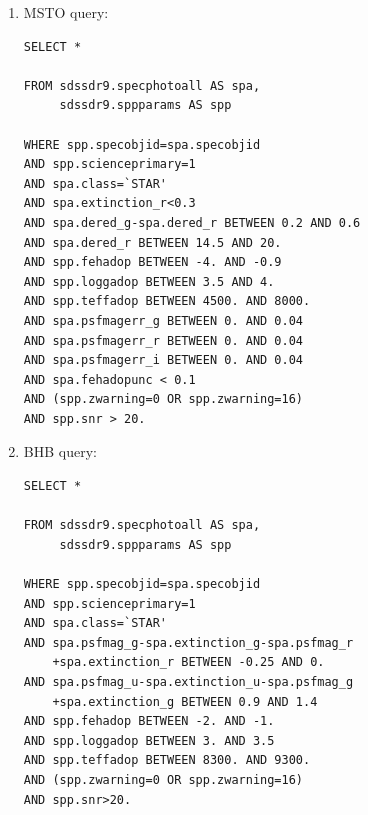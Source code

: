 \documentclass[useAMS,twocolumn,usenatbib]{mn2e}
\begin{document}
\begin{enumerate}
\item MSTO query:
%
\begin{verbatim}
SELECT *

FROM sdssdr9.specphotoall AS spa,
     sdssdr9.sppparams AS spp

WHERE spp.specobjid=spa.specobjid
AND spp.scienceprimary=1 
AND spa.class=`STAR' 
AND spa.extinction_r<0.3
AND spa.dered_g-spa.dered_r BETWEEN 0.2 AND 0.6 
AND spa.dered_r BETWEEN 14.5 AND 20. 
AND spp.fehadop BETWEEN -4. AND -0.9 
AND spp.loggadop BETWEEN 3.5 AND 4. 
AND spp.teffadop BETWEEN 4500. AND 8000.
AND spa.psfmagerr_g BETWEEN 0. AND 0.04
AND spa.psfmagerr_r BETWEEN 0. AND 0.04
AND spa.psfmagerr_i BETWEEN 0. AND 0.04
AND spa.fehadopunc < 0.1 
AND (spp.zwarning=0 OR spp.zwarning=16)
AND spp.snr > 20.
\end{verbatim}
%
\item BHB query:
%
\begin{verbatim}
SELECT * 

FROM sdssdr9.specphotoall AS spa,
     sdssdr9.sppparams AS spp
     
WHERE spp.specobjid=spa.specobjid
AND spp.scienceprimary=1
AND spa.class=`STAR'
AND spa.psfmag_g-spa.extinction_g-spa.psfmag_r
    +spa.extinction_r BETWEEN -0.25 AND 0.
AND spa.psfmag_u-spa.extinction_u-spa.psfmag_g
    +spa.extinction_g BETWEEN 0.9 AND 1.4
AND spp.fehadop BETWEEN -2. AND -1.
AND spp.loggadop BETWEEN 3. AND 3.5
AND spp.teffadop BETWEEN 8300. AND 9300.
AND (spp.zwarning=0 OR spp.zwarning=16)
AND spp.snr>20.
\end{verbatim}
\end{enumerate}
\end{document}
